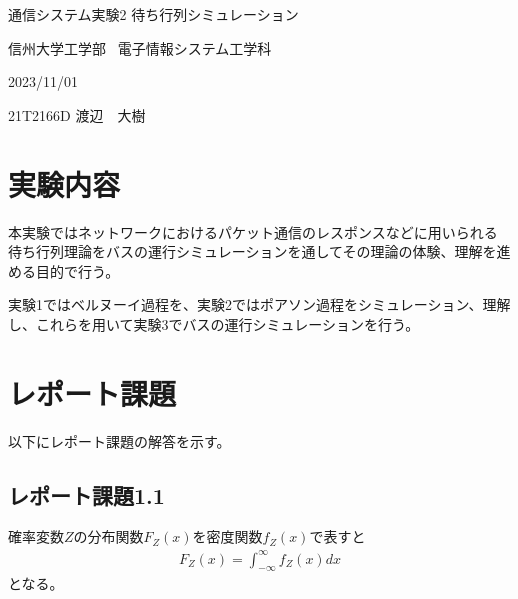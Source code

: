 \documentclass[a4paper,11pt,dvipdfmx]{jsarticle}
\begin{document}
\begin{titlepage}
\noindent
\vspace{6cm}
\begin{center}
\begin{LARGE}
通信システム実験2 待ち行列シミュレーション
\end{LARGE}
\end{center}
\vspace{6cm}
\begin{flushright}
信州大学工学部 \
電子情報システム工学科 \
\begin{description}
\setlength{\leftskip}{8.9cm}
\item[　　実験日:] 2023/11/01
\item[　実験場所:] 
\item[　　実験者:] 21T2166D 渡辺　大樹
\item[共同実験者:] 
\item[　　　　　 ] 
\item[　　　　　 ] 
\item[　　　　　 ] 
\item[　　　　　 ] 
\end{description}
\end{flushright}
\end{titlepage}



\section{実験内容}
本実験ではネットワークにおけるパケット通信のレスポンスなどに用いられる
待ち行列理論をバスの運行シミュレーションを通してその理論の体験、理解を進める目的で行う。

実験1ではベルヌーイ過程を、実験2ではポアソン過程をシミュレーション、理解し、これらを用いて実験3でバスの運行シミュレーションを行う。

\section{レポート課題}
以下にレポート課題の解答を示す。

\subsection*{レポート課題1.1}
確率変数$Z$の分布関数$F_Z(x)$を密度関数$f_Z(x)$で表すと
\begin{align}
    F_Z(x) = \int_{-\infty}^{\infty}f_Z(x)dx
\end{align}
となる。
\end{document}
